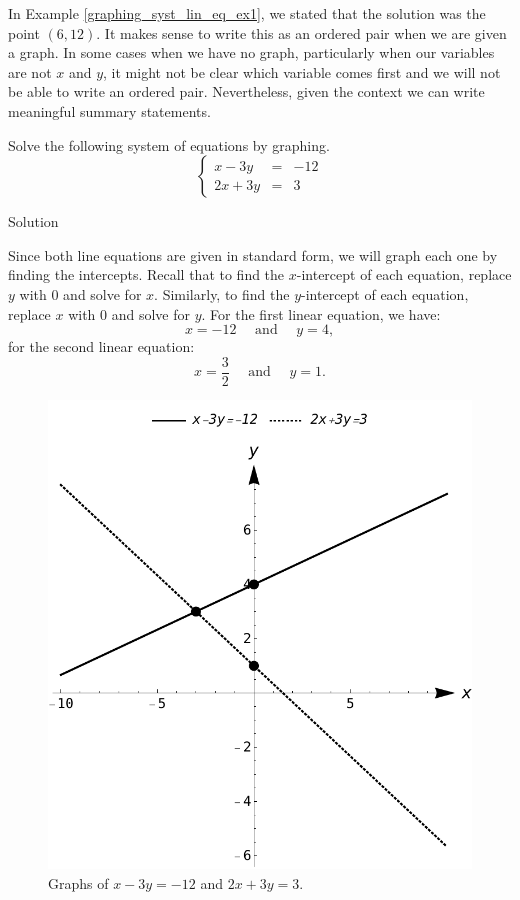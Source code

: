 In Example \ref{graphing_syst_lin_eq_ex1}, we stated that the solution was the point  $(6,12)$. It makes sense to write this as an ordered pair when we are given a graph. In some cases when we have no graph, particularly when our variables are not $x$ and $y$, it might not be clear which variable comes first and we will not be able to write an ordered pair. Nevertheless, given the context we can write meaningful summary statements.	



\begin{example}\label{graphing_syst_lin_eq_ex2}
Solve the following system of equations by graphing.
\[\left\{ \begin{array}{rcl} x-3y & =& -12 \\ 2x+3y& =& 3  \end{array} \right.  \]	


Solution 

Since both line equations are given in standard form, we will graph each one by finding the
intercepts. Recall that to find the $x$-intercept of each equation, replace $y$ with $0$ and solve for $x$. Similarly, to find the $y$-intercept of each equation, replace $x$ with $0$ and solve for $y$. For the first linear equation, we have:
\[ x = -12 \quad \text{ and } \quad y=4, \]
for the second linear equation:
\[ x = \dfrac{3}{2} \quad \text{ and } \quad y=1. \]
	
	
\begin{figure}[H]
	\centering
	\includegraphics[scale=0.6]{fig_Systems_lin_eq_2}
	\caption{Graphs of $x-3y=-12$ and $2x+3y=3$.}
	\label{fig_Systems_lin_eq_2}
\end{figure}
	

\end{example}
